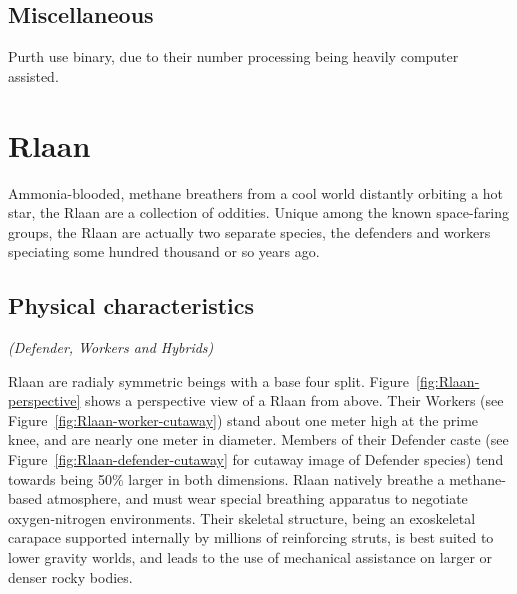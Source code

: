\subsection{Miscellaneous}
Purth use binary, due to their number processing being heavily
computer assisted.

\section{Rlaan}

Ammonia-blooded, methane breathers from a cool world distantly
orbiting a hot star, the Rlaan are a collection of oddities. Unique
among the known space-faring groups, the Rlaan are actually two
separate species, the defenders and workers speciating some hundred
thousand or so years ago.

\subsection{Physical characteristics} 
{\em (Defender, Workers and Hybrids)}

Rlaan are radialy symmetric beings with a base four
split. Figure~\ref{fig:Rlaan-perspective} shows a perspective view of
a Rlaan from above. Their Workers (see
Figure~\ref{fig:Rlaan-worker-cutaway}) stand about one meter high at
the prime knee, and are nearly one meter in diameter. Members of their
Defender caste (see Figure~\ref{fig:Rlaan-defender-cutaway} for
cutaway image of Defender species) tend towards being 50\% larger in
both dimensions. Rlaan natively breathe a methane-based atmosphere,
and must wear special breathing apparatus to negotiate oxygen-nitrogen
environments. Their skeletal structure, being an exoskeletal carapace
supported internally by millions of reinforcing struts, is best suited
to lower gravity worlds, and leads to the use of mechanical assistance
on larger or denser rocky bodies.

